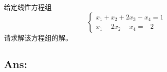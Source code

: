 \begin{example}[线性方程组求解]
    给定线性方程组  
    \[
    \begin{cases}
    x_1 + x_2 + 2x_3 + x_4 = 1 \\
    x_1 - 2x_2 - x_4 = -2
    \end{cases}
    \]
    请求解该方程组的解。
    \end{example}
    
    \subsection*{Ans:}
